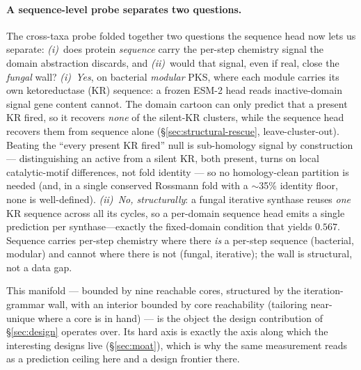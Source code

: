 \paragraph{A sequence-level probe separates two questions.} The cross-taxa probe folded together two
questions the sequence head now lets us separate: \emph{(i)}~does protein \emph{sequence} carry the
per-step chemistry signal the domain abstraction discards, and \emph{(ii)}~would that signal, even if
real, close the \emph{fungal} wall? \emph{(i)~Yes}, on bacterial \emph{modular} PKS, where each module carries its own ketoreductase (KR)
sequence: a frozen ESM-2 head reads inactive-domain signal gene content cannot. The domain cartoon can
only predict that a present KR fired, so it recovers \emph{none} of the silent-KR clusters, while the
sequence head recovers them from sequence alone (\S\ref{sec:structural-rescue}, leave-cluster-out).
Beating the ``every present KR fired'' null is sub-homology signal by construction --- distinguishing an
active from a silent KR, both present, turns on local catalytic-motif differences, not fold identity ---
so no homology-clean partition is needed (and, in a single conserved Rossmann fold with a $\sim$35\%
identity floor, none is well-defined). \emph{(ii)~No, structurally}: a fungal iterative synthase reuses \emph{one} KR
sequence across all its cycles, so a per-domain sequence head emits a single prediction per
synthase---exactly the fixed-domain condition that yields $0.567$. Sequence carries per-step chemistry
where there \emph{is} a per-step sequence (bacterial, modular) and cannot where there is not (fungal,
iterative); the wall is structural, not a data gap.

\medskip
This manifold --- bounded by nine reachable cores, structured by the iteration-grammar wall, with an
interior bounded by core reachability (tailoring near-unique where a core is in hand) --- is the object the design contribution of \S\ref{sec:design}
operates over. Its hard axis is exactly the axis along which the interesting designs live (\S\ref{sec:moat}),
which is why the same measurement reads as a prediction ceiling here and a design frontier there.
